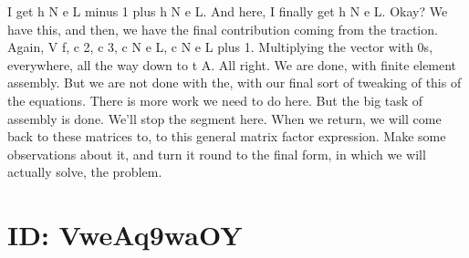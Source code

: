 \documentclass[10pt]{article}
\begin{document}
I get h N e L minus 1 plus h N e L. And here, I finally get h N e L. Okay? We have this, and then, we have the final contribution coming from the traction. Again, V f, c 2, c 3, c N e L, c N e L plus 1. Multiplying the vector with 0s, everywhere, all the way down to t A. All right. We are done, with finite element assembly. But we are not done with the, with our final sort of tweaking of this of the equations. There is more work we need to do here. But the big task of assembly is done. We'll stop the segment here. When we return, we will come back to these matrices to, to this general matrix factor expression. Make some observations about it, and turn it round to the final form, in which we will actually solve, the problem.

\section*{ID: VweAq9waOY}
\end{document}

